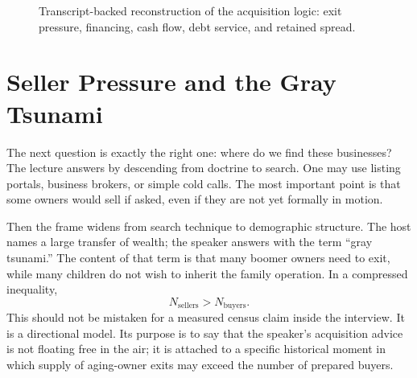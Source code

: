\begin{figure}[h]
\centering
{}
\caption{Transcript-backed reconstruction of the acquisition logic: exit pressure, financing, cash flow, debt service, and retained spread.}
\end{figure}

\section{Seller Pressure and the Gray Tsunami}

The next question is exactly the right one: where do we find these businesses? The lecture answers by descending from doctrine to search. One may use listing portals, business brokers, or simple cold calls. The most important point is that some owners would sell if asked, even if they are not yet formally in motion.

Then the frame widens from search technique to demographic structure. The host names a large transfer of wealth; the speaker answers with the term ``gray tsunami.'' The content of that term is that many boomer owners need to exit, while many children do not wish to inherit the family operation. In a compressed inequality,
\begin{equation}
N_{\text{sellers}} > N_{\text{buyers}}.
\end{equation}
This should not be mistaken for a measured census claim inside the interview. It is a directional model. Its purpose is to say that the speaker's acquisition advice is not floating free in the air; it is attached to a specific historical moment in which supply of aging-owner exits may exceed the number of prepared buyers.

